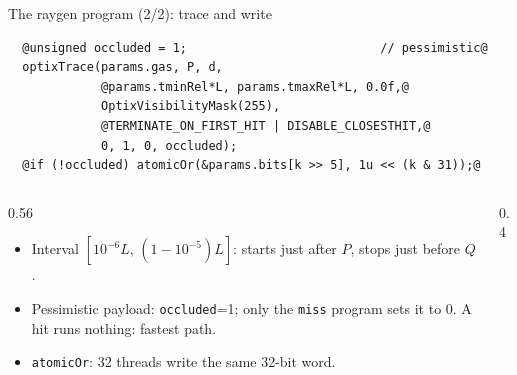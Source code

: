\documentclass[aspectratio=169,10pt]{beamer}
\begin{document}
\begin{frame}[fragile]{The raygen program (2/2): trace and write}
\begin{lstlisting}
  @unsigned occluded = 1;                           // pessimistic@
  optixTrace(params.gas, P, d,
             @params.tminRel*L, params.tmaxRel*L, 0.0f,@
             OptixVisibilityMask(255),
             @TERMINATE_ON_FIRST_HIT | DISABLE_CLOSESTHIT,@
             0, 1, 0, occluded);
  @if (!occluded) atomicOr(&params.bits[k >> 5], 1u << (k & 31));@
\end{lstlisting}
  \begin{columns}[T]
    \begin{column}{0.56\textwidth}
      \begin{itemize}
        \item Interval $[10^{-6}L,\,(1-10^{-5})L]$: starts just after $P$, stops just before $Q$.
        \item \alert{Pessimistic payload}: \texttt{occluded}=1; only the \texttt{miss} program sets it to 0. A hit runs nothing: fastest path.
        \item \texttt{atomicOr}: 32 threads write the same 32-bit word.
      \end{itemize}
    \end{column}
    \begin{column}{0.4\textwidth}
    \end{column}
  \end{columns}
\end{frame}
\end{document}
